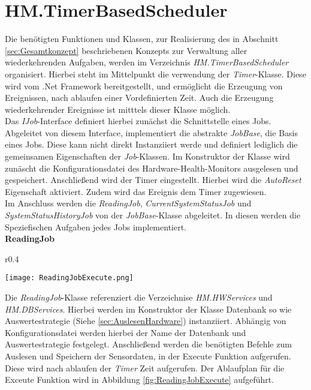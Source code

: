 \newpage
\section{HM.TimerBasedScheduler}
Die benötigten Funktionen und Klassen, zur Realisierung des in Abschnitt \ref{sec:Gesamtkonzept} beschriebenen Konzepts zur Verwaltung aller wiederkehrenden Aufgaben, werden im Verzeichnis \textit{HM.TimerBasedScheduler} organisiert. Hierbei steht im Mittelpunkt die verwendung der \textit{Timer}-Klasse. Diese wird vom .Net Framework bereitgestellt, und ermöglicht die Erzeugung von Ereignissen, nach ablaufen einer Vordefinierten Zeit. Auch die Erzeugung wiederkehrender Ereignisse ist mitttels dieser Klasse möglich. \cite{SystemTimers}\\
Das \textit{IJob}-Interface definiert hierbei zunächst die Schnittstelle eines Jobs. Abgeleitet von diesem Interface, implementiert die abstrakte \textit{JobBase}, die Basis eines Jobs. Diese kann nicht direkt Instanziiert werde und definiert lediglich die gemeinsamen Eigenschaften der \textit{Job}-Klassen. Im Konstruktor der Klasse wird zunäscht die Konfigurationsdatei des Hardware-Health-Monitors ausgelesen und gespeichert. Anschließend wird der Timer eingestellt. Hierbei wird die \textit{AutoReset} Eigenschaft aktiviert. Zudem wird das Ereignis dem Timer zugewiesen.\\
Im Anschluss werden die \textit{ReadingJob}, \textit{CurrentSystemStatusJob} und \textit{SystemStatusHistoryJob} von der \textit{JobBase}-Klasse abgeleitet. In diesen werden die Speziefischen Aufgaben jedes Jobs implementiert.\\

\textbf{ReadingJob}\\
\begin{wrapfigure}{r}{0.4\textwidth}
    \vspace{-1.2cm}
    \begin{center}
      \texttt{[image: ReadingJobExecute.png]}
    \end{center}
    \vspace{-0.5cm}
    \caption{}
    \label{fig:ReadingJobExecute}
  \end{wrapfigure}
Die \textit{ReadingJob}-Klasse referenziert die Verzeichnise \textit{HM.HWServices} und \textit{HM.DBServices}. Hierbei werden im Konstruktor der Klasse Datenbank so wie Auswertestrategie (Siehe \ref{sec:AuslesenHardware}) instanziiert. Abhängig von Konfigurationsdatei werden hierbei der Name der Datenbank und Auswertestrategie festgelegt. Anschließend werden die benötigten Befehle zum Auslesen und Speichern der Sensordaten, in der Execute Funktion aufgerufen. Diese wird nach ablaufen der \textit{Timer} Zeit aufgerufen. Der Ablaufplan für die Exceute Funktion wird in Abbildung \ref{fig:ReadingJobExecute} aufgeführt.\\

